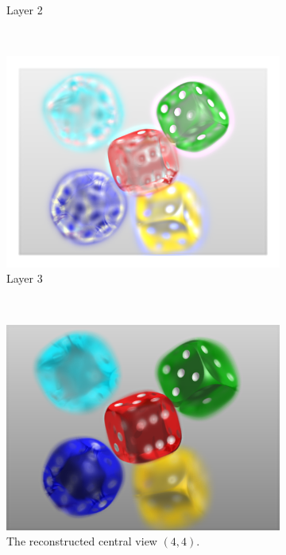\documentclass[11pt,a4paper,titlepage]{article}
\begin{document}
\begin{figure}[h]
\begin{subfigure}[c]{0.3\textwidth}
		\caption{Layer 2}
	\end{subfigure}%
	~
	\begin{subfigure}[c]{0.3\textwidth}
		\includegraphics[width=\textwidth]{results/dice_orthographic_rec_fov10_blurry_3Layers/3.png}
		\caption{Layer 3}
	\end{subfigure}%
	\\
	\begin{subfigure}[t]{0.4\textwidth}
		\includegraphics[width=\textwidth]{results/dice_orthographic_rec_fov10_blurry_3Layers/central_view_reconstruction.png}
		\caption{The reconstructed central view $\left( 4, 4 \right)$.}
	\end{subfigure}%
	~
	\begin{subfigure}[t]{0.4\textwidth}

\end{subfigure}
\end{figure}
\end{document}
